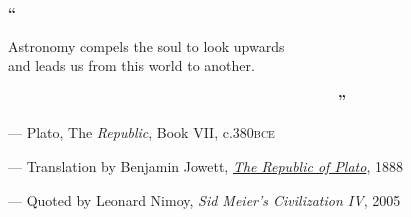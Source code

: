 \cleardoublepage{}


\vspace*{2cm}

\begin{center}
    \begin{Huge}
        \textbf{\textcolor{GOTOlightblue}{``~~~~~~~~~~~~~~~~~~~~~~~~~~~~~~~~~~~~~~~~~~~~~}} \\
    \end{Huge}
    \begin{LARGE}
        \vspace{-\baselineskip}
        Astronomy compels the soul to look upwards \\
        and leads us from this world to another. \\
        \vspace{-\baselineskip}
    \end{LARGE}
    \begin{Huge}
        \textbf{\textcolor{GOTOlightblue}{~~~~~~~~~~~~~~~~~~~~~~~~~~~~~~~~~~~~~~~~~''}} \\
    \end{Huge}
\end{center}

\begin{small}
    \hspace{4cm} --- Plato, The \textit{Republic}, Book VII, c.\@ 380\@ \textsc{bce}

    \vspace{0.2cm}
    \hspace{4cm} --- Translation by Benjamin Jowett, {\hypersetup{urlcolor=black}\href{http://www.gutenberg.org/files/55201/55201-h/55201-h.htm}{\textit{The Republic of Plato}}}, 1888

    \vspace{0.2cm}
    \hspace{4cm} --- Quoted by Leonard Nimoy, \textit{Sid Meier's Civilization IV}, 2005
\end{small}


